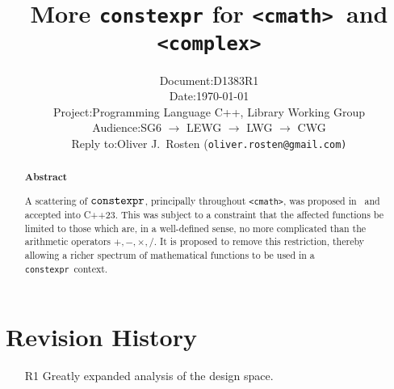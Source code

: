 \documentclass[prd,twocolumn,amsmath,amssymb,nofootinbib,eqsecnum]{revtex4-1}
\newcommand{\constexpr}{\code{constexpr}\xspace}
\newcommand{\code}[1]{{\tt #1}}
\newcommand{\header}[1]{{\tt <#1>}}
\newcommand{\cmath}{\header{cmath}}
\newcommand{\complex}{\header{complex}}
\newcommand{\Operators}{\ensuremath{+,-,\times,/}}
\begin{document}
\title{More \constexpr for \cmath\ and \complex}

\author{
\begin{tabular}{ll}
	Document: & D1383R1
\\
	Date: & \today
\\
	Project: & Programming Language C++, Library Working Group
\\
	Audience: & SG6 $\rightarrow$ LEWG $\rightarrow$ LWG $\rightarrow$ CWG
\\
	Reply to: & Oliver J.\ Rosten {(\tt oliver.rosten@gmail.com)}
\end{tabular}
}

\begin{abstract}

\begin{center} {\bf Abstract} \end{center}

A scattering of $\constexpr$, principally throughout \cmath, was proposed in~\cite{Rosten-constexpr} and accepted into C++23. This was subject to a constraint that the affected functions be limited to those which are, in a well-defined sense, no more complicated than the arithmetic operators \Operators. It is proposed to remove this restriction, thereby allowing a richer spectrum of mathematical functions to be used in a \constexpr\ context. 


\end{abstract}


\maketitle
\tableofcontents

\section{Revision History}

\begin{enumerate}
	\item[R1] Greatly expanded analysis of the design space.
\end{enumerate}
\end{document}
